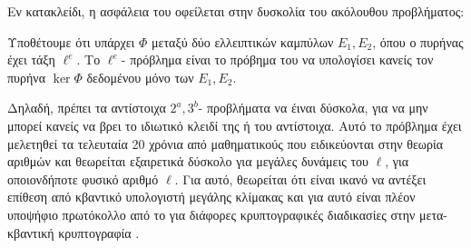 \documentclass[oneside,a4paper]{article}
\begin{document}
Εν κατακλείδι, η ασφάλεια του  οφείλεται στην δυσκολία του ακόλουθου προβλήματος:
\begin{defn}
	Υποθέτουμε ότι υπάρχει  $\Phi$ μεταξύ δύο ελλειπτικών καμπύλων $E_1, E_2$, όπου ο πυρήνας έχει τάξη $\ell^e$. Το $\ell^e$- πρόβλημα είναι το πρόβημα του να υπολογίσει κανείς τον πυρήνα $\ker \Phi$ δεδομένου μόνο των $E_1, E_2$.
\end{defn}
Δηλαδή, πρέπει τα αντίστοιχα $2^a,3^b$- προβλήματα να έιναι δύσκολα, για να μην μπορεί κανείς να βρει το ιδιωτικό κλειδί της  ή του  αντίστοιχα. Αυτό το πρόβλημα έχει μελετηθεί τα τελευταία 20 χρόνια από μαθηματικούς που ειδικεύονται στην θεωρία αριθμών και θεωρείται εξαιρετικά δύσκολο για μεγάλες δυνάμεις του $\ell$, για οποιονδήποτε φυσικό αριθμό $\ell$. Για αυτό, θεωρείται ότι είναι ικανό να αντέξει επίθεση από κβαντικό υπολογιστή μεγάλης κλίμακας και για αυτό είναι πλέον υποψήφιο πρωτόκολλο από το  για διάφορες κρυπτογραφικές διαδικασίες στην μετα-κβαντική κρυπτογραφία \cite{nistquantum}.


\pagebreak
\end{document}
